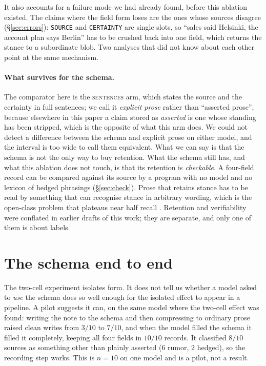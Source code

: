 \documentclass[11pt]{article}
\begin{document}
It also accounts for a failure mode we had already found, before this ablation existed.
The claims where the field form loses are the ones whose sources disagree
(\S\ref{sec:errors}): \texttt{SOURCE} and \texttt{CERTAINTY} are single slots, so ``sales
said Helsinki, the account plan says Berlin'' has to be crushed back into one field, which
returns the stance to a subordinate blob. Two analyses that did not know about each other
point at the same mechanism.

\paragraph{What survives for the schema.} The comparator here is the \textsc{sentences}
arm, which states the source and the certainty in full sentences; we call it \emph{explicit
prose} rather than ``asserted prose'', because elsewhere in this paper a claim stored as
\emph{asserted} is one whose standing has been stripped, which is the opposite of what this
arm does. We could not detect a difference between the schema and explicit prose on either
model, and the interval is too wide to call them equivalent. What we can say is that the
schema is not the only way to buy retention. What the schema still has, and what this
ablation does not touch, is that its retention is \emph{checkable}. A four-field record can
be compared against its source by a program with no model and no lexicon of hedged
phrasings (\S\ref{sec:check}). Prose that retains stance has to be read by something that
can recognise stance in arbitrary wording, which is the open-class problem that plateaus
near half recall \citep{kwon2026factwash}. Retention and verifiability were conflated in
earlier drafts of this work; they are separate, and only one of them is about labels.

\section{The schema end to end}
\label{sec:endtoend}
The two-cell experiment isolates form. It does not tell us whether a model asked to
\emph{use} the schema does so well enough for the isolated effect to appear in a
pipeline. A pilot suggests it can, on the same model where the two-cell effect was
found: writing the note to the schema and then compressing to ordinary prose raised
clean writes from $3/10$ to $7/10$, and when the model filled the schema it filled it
completely, keeping all four fields in $10/10$ records. It classified $8/10$ sources as
something other than plainly asserted ($6$ rumor, $2$ hedged), so the recording step
works. This is $n=10$ on one model and is a pilot, not a result.
\end{document}
